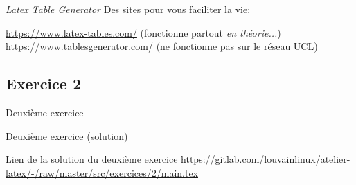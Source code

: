 \begin{frame}[fragile]{\textit{Latex Table Generator}}
  Des sites pour vous faciliter la vie:
  \begin{center}
    \url{https://www.latex-tables.com/} (fonctionne partout \textit{en théorie...})\\
    \url{https://www.tablesgenerator.com/} {\color{red}(ne fonctionne pas sur le réseau
     UCL)}
  \end{center}
  \begin{center}
  \end{center}
\end{frame}
\subsection{Exercice 2}

\begin{frame}[fragile]{Deuxième exercice}
  \begin{center}
  \end{center}  
\end{frame}

\begin{frame}[fragile]{Deuxième exercice (solution)}
  \begin{center}
  Lien de la solution du deuxième exercice \url{https://gitlab.com/louvainlinux/atelier-latex/-/raw/master/src/exercices/2/main.tex}
  \end{center}
\end{frame}
